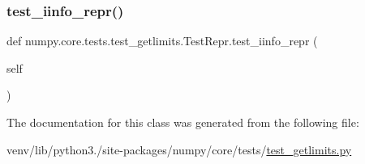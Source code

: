 \mbox{\label{classnumpy_1_1core_1_1tests_1_1test__getlimits_1_1TestRepr_affce917648f022e85f529d2d1a1ddfea}} 
\subsubsection{\texorpdfstring{test\+\_\+iinfo\+\_\+repr()}{test\_iinfo\_repr()}}
{\footnotesize\ttfamily def numpy.\+core.\+tests.\+test\+\_\+getlimits.\+Test\+Repr.\+test\+\_\+iinfo\+\_\+repr (\begin{DoxyParamCaption}\item[{}]{self }\end{DoxyParamCaption})}



The documentation for this class was generated from the following file\+:\begin{DoxyCompactItemize}
\item 
venv/lib/python3./site-\/packages/numpy/core/tests/\hyperlink{test__getlimits_8py}{test\+\_\+getlimits.\+py}\end{DoxyCompactItemize}
